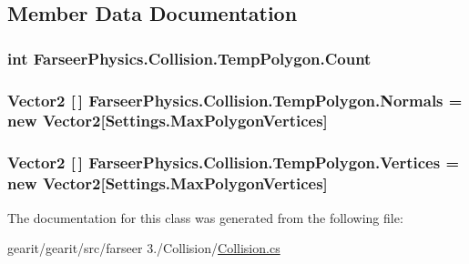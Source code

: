 \subsection{Member Data Documentation}
\hypertarget{class_farseer_physics_1_1_collision_1_1_temp_polygon_a3b26651a667fabcf245ff6d36cab85f2}{
\subsubsection[{Count}]{\setlength{\rightskip}{0pt plus 5cm}int Farseer\+Physics.\+Collision.\+Temp\+Polygon.\+Count}}\label{class_farseer_physics_1_1_collision_1_1_temp_polygon_a3b26651a667fabcf245ff6d36cab85f2}
\hypertarget{class_farseer_physics_1_1_collision_1_1_temp_polygon_a45b8cf3f2f8b071e07155c5c74d8dd04}{
\subsubsection[{Normals}]{\setlength{\rightskip}{0pt plus 5cm}Vector2 \mbox{[}$\,$\mbox{]} Farseer\+Physics.\+Collision.\+Temp\+Polygon.\+Normals = new Vector2\mbox{[}Settings.\+Max\+Polygon\+Vertices\mbox{]}}}\label{class_farseer_physics_1_1_collision_1_1_temp_polygon_a45b8cf3f2f8b071e07155c5c74d8dd04}
\hypertarget{class_farseer_physics_1_1_collision_1_1_temp_polygon_a437767a6ead66438150cb6a5b44e8ccb}{
\subsubsection[{Vertices}]{\setlength{\rightskip}{0pt plus 5cm}Vector2 \mbox{[}$\,$\mbox{]} Farseer\+Physics.\+Collision.\+Temp\+Polygon.\+Vertices = new Vector2\mbox{[}Settings.\+Max\+Polygon\+Vertices\mbox{]}}}\label{class_farseer_physics_1_1_collision_1_1_temp_polygon_a437767a6ead66438150cb6a5b44e8ccb}


The documentation for this class was generated from the following file\+:\begin{DoxyCompactItemize}
\item 
gearit/gearit/src/farseer 3./\+Collision/\hyperlink{_collision_8cs}{Collision.\+cs}\end{DoxyCompactItemize}
